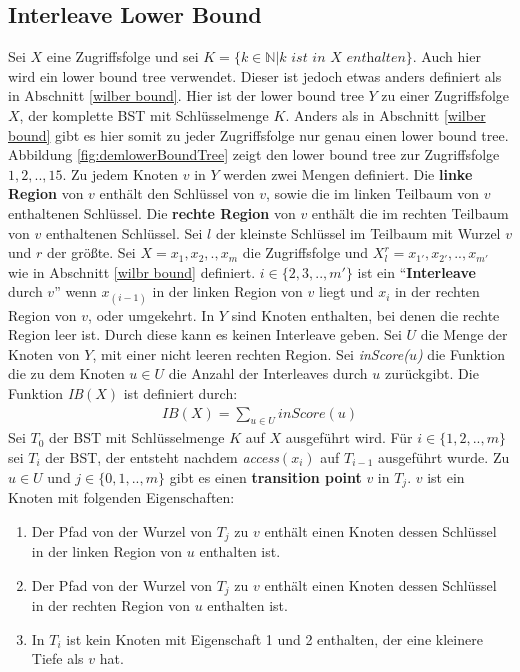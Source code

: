 \documentclass[a4paper,12pt]{article}
\begin{document}
\subsection{Interleave Lower Bound} \label{interBound}
Sei $X$ eine Zugriffsfolge und sei $K = \{k \in \mathbb{N} \vert k \textit{ ist in $X$ enthalten}\}$. Auch hier wird ein lower bound tree verwendet. Dieser ist jedoch etwas anders definiert als in Abschnitt \ref{wilber bound}. Hier ist der lower bound tree $Y$ zu einer Zugriffsfolge $X$, der komplette BST mit Schlüsselmenge $K$. Anders als in Abschnitt \ref{wilber bound}  gibt es hier somit zu jeder Zugriffsfolge nur genau einen lower bound tree. Abbildung \ref{fig:demlowerBoundTree} zeigt den lower bound tree zur Zugriffsfolge $1, 2,.., 15$. Zu jedem Knoten $v$ in $Y$ werden zwei Mengen definiert. Die \textbf{linke Region} von $v$ enthält den Schlüssel von $v$, sowie die im linken Teilbaum von $v$ enthaltenen Schlüssel.  Die \textbf{rechte Region} von $v$ enthält die im rechten Teilbaum von $v$ enthaltenen Schlüssel. Sei $l$ der kleinste Schlüssel im Teilbaum mit Wurzel $v$ und $r$ der größte. Sei $X = x_1,x_2,.,x_m$ die Zugriffsfolge und $X^r_l = {x_{1'},x_{2'},..,x_{m'}}$ wie in Abschnitt \ref{wilbr bound} definiert. $i \in \{2,3,..,m'\}$ ist ein \enquote{\textbf{Interleave} durch $v$} wenn $x_{\left(i -1\right)}$ in der linken Region von $v$ liegt und $x_i$ in der rechten Region von $v$, oder umgekehrt. In $Y$ sind Knoten enthalten, bei denen die rechte Region leer ist. Durch diese kann es keinen Interleave geben. Sei $U$ die Menge der Knoten von $Y$, mit einer nicht leeren rechten Region. Sei \textit{inScore($u$)} die Funktion die zu dem Knoten $u \in U$ die Anzahl der Interleaves durch $u$ zurückgibt.  Die Funktion \textit{IB$\left(X\right)$} ist definiert durch:
\begin{align*}
\mathit{IB}\left(X\right) = \sum_{u \in U} \mathit{inScore}\left(u\right)
\end{align*}
Sei $T_0$ der BST mit Schlüsselmenge $K$ auf $X$ ausgeführt wird. Für $i \in \{1,2,..,m\}$ sei $T_i$ der BST, der entsteht nachdem \textit{access}$\left(x_i\right)$ auf $T_{i-1}$ ausgeführt wurde. Zu $u \in U$ und  $j \in \{0,1,..,m\}$ gibt es einen \textbf{transition point} $v$ in $T_j$. $v$ ist ein Knoten mit folgenden Eigenschaften:\\
\begin{enumerate}
	\item Der Pfad von der Wurzel von $T_j$ zu $v$ enthält einen Knoten dessen Schlüssel in der linken Region von $u$ enthalten ist.
	\item Der Pfad von der Wurzel von $T_j$ zu $v$ enthält einen Knoten dessen Schlüssel in der rechten Region von $u$ enthalten ist.
	\item In $T_i$ ist kein Knoten mit Eigenschaft 1 und 2 enthalten, der eine kleinere Tiefe als $v$ hat. 
\end{enumerate}
\end{document}
